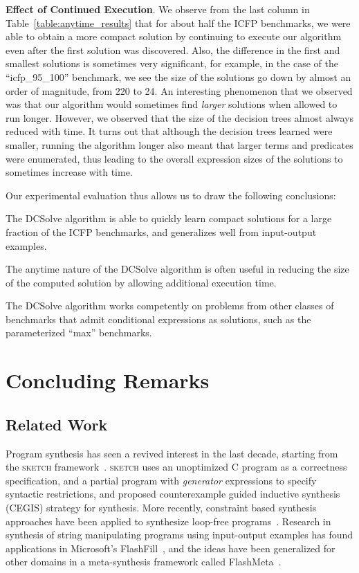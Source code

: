 \documentclass{llncs}
\newcommand{\dcsolve}{{\sffamily\fontsize{8.5}{10}\selectfont
    DCSolve}\xspace}
\renewcommand{\paragraph}[1]{\par\noindent\textbf{#1}.}
\newcommand{\sketch}{\textsc{sketch}\xspace}
\begin{document}
\paragraph{Effect of Continued Execution}
We observe from the last column in Table~\ref{table:anytime_results}
that for about half the ICFP benchmarks, we were able to obtain a more
compact solution by continuing to execute our algorithm even after the
first solution was discovered. Also, the difference in the first and
smallest solutions is sometimes very significant, for example, in the
case of the ``icfp\_95\_100'' benchmark, we see the size of the
solutions go down by almost an order of magnitude, from 220 to 24. An
interesting phenomenon that we observed was that our algorithm would
sometimes find \emph{larger} solutions when allowed to run
longer. However, we observed that the size of the decision trees
almost always reduced with time. It turns out that although the
decision trees learned were smaller, running the algorithm longer also
meant that larger terms and predicates were enumerated, thus leading
to the overall expression sizes of the solutions to sometimes increase
with time.

Our experimental evaluation thus allows us to draw the following
conclusions:
\begin{inparaenum}[(a)]
\item
The \dcsolve algorithm is able to quickly learn compact solutions for
a large fraction of the ICFP benchmarks, and generalizes well from
input-output examples.
\item
The anytime nature of the \dcsolve algorithm is often useful in
reducing the size of the computed solution by allowing additional
execution time.
\item
The \dcsolve algorithm works competently on problems from other
classes of benchmarks that admit conditional expressions as solutions,
such as the parameterized ``max'' benchmarks.
\end{inparaenum}

\section{Concluding Remarks}
\label{sec:conclusion}

\subsection{Related Work}
Program synthesis has seen a revived interest in the last decade,
starting from the \sketch
framework~\cite{solar-lezama-05,solar-lezama-06}. \sketch uses an
unoptimized C program as a correctness specification, and a partial
program with \emph{generator} expressions to specify syntactic
restrictions, and proposed counterexample guided inductive synthesis
(CEGIS) strategy for synthesis. More recently, constraint based
synthesis approaches have been applied to synthesize loop-free
programs~\cite{jha-10, gulwani-pldi-11}. Research in synthesis of
string manipulating programs using input-output examples has found
applications in Microsoft's FlashFill~\cite{gulwani-popl-11}, and the
ideas have been generalized for other domains in a meta-synthesis
framework called FlashMeta~\cite{polozov-15}.
\end{document}
